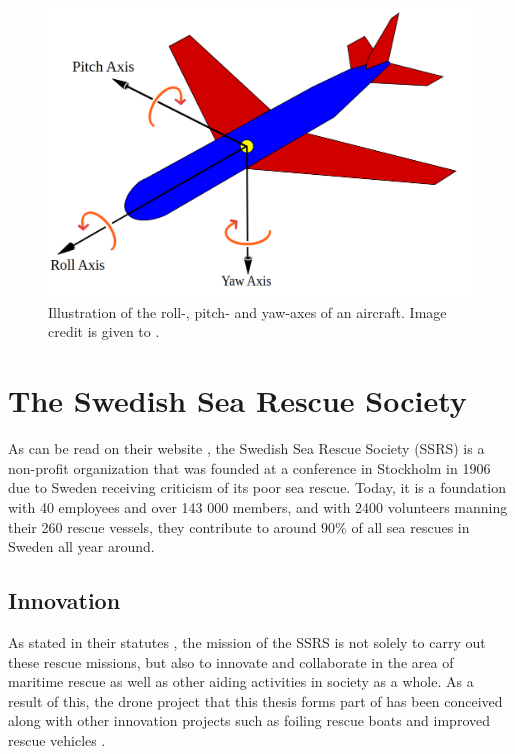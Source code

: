 \documentclass[nofilelist]{cslthse-msc}
\begin{document}
\begin{figure}[!hbt]
   \centering
   \includegraphics[scale=0.25]{images/pitch-yaw-roll.png} 
   \caption{Illustration of the roll-, pitch- and yaw-axes of an aircraft. Image credit is given to \cite{aircraft-axes-pic}.}
   \label{fig:aircraft-axes}
\end{figure}

\section{The Swedish Sea Rescue Society}
As can be read on their website \cite{ssrs}, the Swedish Sea Rescue Society (SSRS) is a non-profit organization that was founded at a conference in Stockholm in 1906 due to Sweden receiving criticism of its poor sea rescue. Today, it is a foundation with 40 employees and over 143 000 members, and with 2400 volunteers manning their 260 rescue vessels, they contribute to around 90\% of all sea rescues in Sweden all year around.

\subsection{Innovation}
As stated in their statutes \cite{ssrs-statues}, the mission of the SSRS is not solely to carry out these rescue missions, but also to innovate and collaborate in the area of maritime rescue as well as other aiding activities in society as a whole. As a result of this, the drone project that this thesis forms part of has been conceived along with other innovation projects such as foiling rescue boats and improved rescue vehicles \cite{surtsey-innovation}.
\end{document}
